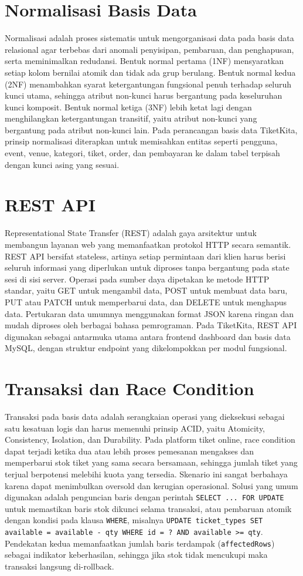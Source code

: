 \documentclass[12pt,a4paper]{report}
\begin{document}
\section{Normalisasi Basis Data}
Normalisasi adalah proses sistematis untuk mengorganisasi data pada basis data relasional agar terbebas dari anomali penyisipan, pembaruan, dan penghapusan, serta meminimalkan redudansi. Bentuk normal pertama (1NF) mensyaratkan setiap kolom bernilai atomik dan tidak ada grup berulang. Bentuk normal kedua (2NF) menambahkan syarat ketergantungan fungsional penuh terhadap seluruh kunci utama, sehingga atribut non-kunci harus bergantung pada keseluruhan kunci komposit. Bentuk normal ketiga (3NF) lebih ketat lagi dengan menghilangkan ketergantungan transitif, yaitu atribut non-kunci yang bergantung pada atribut non-kunci lain. Pada perancangan basis data TiketKita, prinsip normalisasi diterapkan untuk memisahkan entitas seperti pengguna, event, venue, kategori, tiket, order, dan pembayaran ke dalam tabel terpisah dengan kunci asing yang sesuai.

\section{REST API}
Representational State Transfer (REST) adalah gaya arsitektur untuk membangun layanan web yang memanfaatkan protokol HTTP secara semantik. REST API bersifat stateless, artinya setiap permintaan dari klien harus berisi seluruh informasi yang diperlukan untuk diproses tanpa bergantung pada state sesi di sisi server. Operasi pada sumber daya dipetakan ke metode HTTP standar, yaitu GET untuk mengambil data, POST untuk membuat data baru, PUT atau PATCH untuk memperbarui data, dan DELETE untuk menghapus data. Pertukaran data umumnya menggunakan format JSON karena ringan dan mudah diproses oleh berbagai bahasa pemrograman. Pada TiketKita, REST API digunakan sebagai antarmuka utama antara frontend dashboard dan basis data MySQL, dengan struktur endpoint yang dikelompokkan per modul fungsional.

\section{Transaksi dan Race Condition}
Transaksi pada basis data adalah serangkaian operasi yang dieksekusi sebagai satu kesatuan logis dan harus memenuhi prinsip ACID, yaitu Atomicity, Consistency, Isolation, dan Durability. Pada platform tiket online, race condition dapat terjadi ketika dua atau lebih proses pemesanan mengakses dan memperbarui stok tiket yang sama secara bersamaan, sehingga jumlah tiket yang terjual berpotensi melebihi kuota yang tersedia. Skenario ini sangat berbahaya karena dapat menimbulkan oversold dan kerugian operasional. Solusi yang umum digunakan adalah penguncian baris dengan perintah \texttt{SELECT ... FOR UPDATE} untuk memastikan baris stok dikunci selama transaksi, atau pembaruan atomik dengan kondisi pada klausa \texttt{WHERE}, misalnya \texttt{UPDATE ticket\_types SET available = available - qty WHERE id = ? AND available >= qty}. Pendekatan kedua memanfaatkan jumlah baris terdampak (\texttt{affectedRows}) sebagai indikator keberhasilan, sehingga jika stok tidak mencukupi maka transaksi langsung di-rollback.
\end{document}
